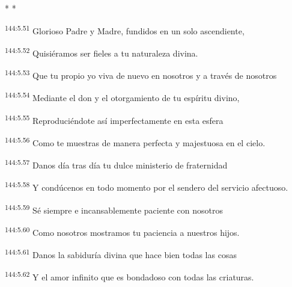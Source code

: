 \begin{center}
	\par * * *
\end{center}

\begin{center}
\par 
\textsuperscript{144:5.51} Glorioso Padre y Madre, fundidos en un solo ascendiente,

\par 
\textsuperscript{144:5.52} Quisiéramos ser fieles a tu naturaleza divina.

\par 
\textsuperscript{144:5.53} Que tu propio yo viva de nuevo en nosotros y a través de nosotros

\par 
\textsuperscript{144:5.54} Mediante el don y el otorgamiento de tu espíritu divino,

\par 
\textsuperscript{144:5.55} Reproduciéndote así imperfectamente en esta esfera

\par 
\textsuperscript{144:5.56} Como te muestras de manera perfecta y majestuosa en el cielo.

\par 
\textsuperscript{144:5.57} Danos día tras día tu dulce ministerio de fraternidad

\par 
\textsuperscript{144:5.58} Y condúcenos en todo momento por el sendero del servicio afectuoso.

\par 
\textsuperscript{144:5.59} Sé siempre e incansablemente paciente con nosotros

\par 
\textsuperscript{144:5.60} Como nosotros mostramos tu paciencia a nuestros hijos.

\par 
\textsuperscript{144:5.61} Danos la sabiduría divina que hace bien todas las cosas

\par 
\textsuperscript{144:5.62} Y el amor infinito que es bondadoso con todas las criaturas.


\end{center}
